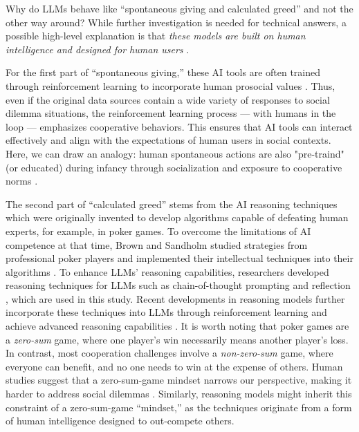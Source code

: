 Why do LLMs behave like “spontaneous giving and calculated greed” and not the other way around?
While further investigation is needed for technical answers, a possible high-level explanation is that \textit{these models are built on human intelligence and designed for human users} \cite{bonnefon2020machine}.

For the first part of “spontaneous giving,” these AI tools are often trained through reinforcement learning to incorporate human prosocial values \cite{bai2022training, rafailov2023direct}.
Thus, even if the original data sources contain a wide variety of responses to social dilemma situations, the reinforcement learning process --- with humans in the loop --- emphasizes cooperative behaviors. 
This ensures that AI tools can interact effectively and align with the expectations of human users in social contexts.
Here, we can draw an analogy: human spontaneous actions are also "pre-traind" (or educated) during infancy through socialization and exposure to cooperative norms \cite{warneken2007helping}.

The second part of “calculated greed” stems from the AI reasoning techniques which were originally invented to develop algorithms capable of defeating human experts, for example, in poker games.
To overcome the limitations of AI competence at that time, Brown and Sandholm studied strategies from professional poker players and implemented their intellectual techniques into their algorithms \cite{brown2019superhuman}.
To enhance LLMs' reasoning capabilities, researchers developed reasoning techniques for LLMs such as chain-of-thought prompting \cite{wei2022chain} and reflection \cite{shinn2023reflexion}, which are used in this study.
Recent developments in reasoning models further incorporate these techniques into LLMs through reinforcement learning and achieve advanced reasoning capabilities \cite{jaech2024openai, guo2025deepseek, muennighoff2025s1}.
It is worth noting that poker games are a \textit{zero-sum} game, where one player's win necessarily means another player's loss.
In contrast, most cooperation challenges involve a \textit{non-zero-sum} game, where everyone can benefit, and no one needs to win at the expense of others.
Human studies suggest that a zero-sum-game mindset narrows our perspective, making it harder to address social dilemmas \cite{davidai2023psychology}.
Similarly, reasoning models might inherit this constraint of a zero-sum-game “mindset,” as the techniques originate from a form of human intelligence designed to out-compete others.

